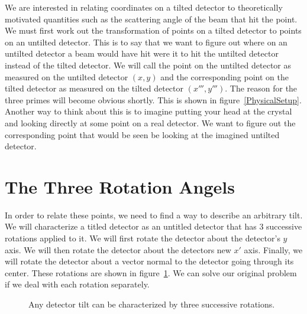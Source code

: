 We are interested in relating
coordinates on a tilted detector 
to theoretically motivated quantities such as 
the scattering angle of the beam that hit the
point. We must first work
out the transformation of points on a tilted detector
to points on an untilted detector. This is to say
that we want to figure out where on an untilted 
detector a beam would have hit were it to hit
the untilted detector instead of the tilted detector.
We will call the point on the untilted detector
as measured on the untilted detector $(x,y)$ 
and the corresponding point on the tilted detector
as measured on the tilted detector $(x''',y''')$. 
The reason for the three primes will become obvious
shortly. This is shown in 
figure~\ref{PhysicalSetup}. Another way to think
about this is to imagine putting your 
head at the crystal and looking directly 
at some point on a real
detector. We want to figure out
the corresponding point that would be seen be looking
at the imagined untilted detector.

\begin{SCfigure}[1][bthp]
    \centering
    
    \caption{The detector 
    is titled with respect to the 
    incoming beam. We are interested in relating
    the point on the tilted detector $(x''',y''')$ to the
    point $(x,y)$ on the imagined untilted detector.}
    \label{PhysicalSetup}
\end{SCfigure}

\section{The Three Rotation Angels}
\index{$\alpha$} \index{$\beta$}  
In order to relate these points, we need to find a way to 
describe an arbitrary tilt. We will 
characterize a titled detector as an untitled detector
that has 3 successive rotations applied to it. 
We will first rotate the detector about the detector's $y$
axis. We will then rotate the detector about the detectors
new $x'$ axis. Finally, we will rotate the detector about
a vector normal to the detector going through its center.
These rotations are shown in figure~\ref{ThreeTilts}.
We can solve our original problem if we deal
with each rotation separately.

\begin{figure}[htb]
    \centering
    \hspace{1em}
    \hspace{1em}
    \caption{Any detector tilt can be characterized 
    by three successive rotations.}
    \label{ThreeTilts}
\end{figure}

